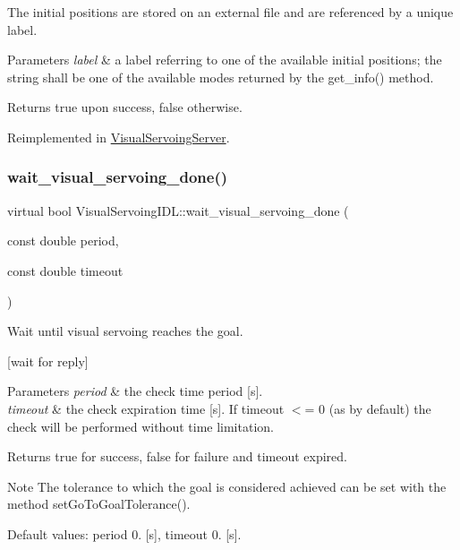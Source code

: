 The initial positions are stored on an external file and are referenced by a unique label. 
\begin{DoxyParams}{Parameters}
{\em label} & a label referring to one of the available initial positions; the string shall be one of the available modes returned by the get\+\_\+info() method. \\
\hline
\end{DoxyParams}
\begin{DoxyReturn}{Returns}
true upon success, false otherwise. 
\end{DoxyReturn}


Reimplemented in \hyperlink{classVisualServoingServer_aded37e0e0111c40fe5f869b16bb1f799}{Visual\+Servoing\+Server}.

\mbox{\label{classVisualServoingIDL_aa9c9a265e56b0f85c297d2b7d3c8d9c3}} 
\subsubsection{\texorpdfstring{wait\+\_\+visual\+\_\+servoing\+\_\+done()}{wait\_visual\_servoing\_done()}}
{\footnotesize\ttfamily virtual bool Visual\+Servoing\+I\+D\+L\+::wait\+\_\+visual\+\_\+servoing\+\_\+done (\begin{DoxyParamCaption}\item[{const double}]{period,  }\item[{const double}]{timeout }\end{DoxyParamCaption})\hspace{0.3cm}{\ttfamily [virtual]}}



Wait until visual servoing reaches the goal. 

\mbox{[}wait for reply\mbox{]} 
\begin{DoxyParams}{Parameters}
{\em period} & the check time period \mbox{[}s\mbox{]}. \\
\hline
{\em timeout} & the check expiration time \mbox{[}s\mbox{]}. If timeout $<$= 0 (as by default) the check will be performed without time limitation. \\
\hline
\end{DoxyParams}
\begin{DoxyReturn}{Returns}
true for success, false for failure and timeout expired. 
\end{DoxyReturn}
\begin{DoxyNote}{Note}
The tolerance to which the goal is considered achieved can be set with the method set\+Go\+To\+Goal\+Tolerance(). 

Default values\+: period 0. \mbox{[}s\mbox{]}, timeout 0. \mbox{[}s\mbox{]}. 
\end{DoxyNote}


